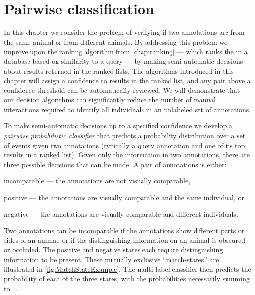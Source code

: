 
\begin{comment}
fixtex --reformat --fpaths chapter4-pairclf.tex --print
fixtex --fpaths chapter4-pairclf.tex --outline --asmarkdown --numlines=999 

fixtex --fpaths chapter4-pairclf.tex --outline --asmarkdown --numlines=999 --shortcite -w && ./checklang.py outline_chapter4-pairclf.md
https://www.languagetool.org/
\end{comment}

\newcommand{\nan}{\text{nan}}

\chapter{Pairwise classification}\label{chap:pairclf}

In this chapter we consider the problem of verifying if two annotations are from the same animal or from different
animals. By addressing this problem we improve upon the ranking algorithm from \cref{chap:ranking} --- which ranks
the \names{} in a database based on similarity to a query --- by making semi-automatic decisions about results
returned in the ranked lists. The algorithms introduced in this chapter will assign a confidence to results in the
ranked list, and any pair above a confidence threshold can be automatically reviewed. We will demonstrate that our
decision algorithms can significantly reduce the number of manual interactions required to identify all individuals
in an unlabeled set of annotations.

To make semi-automatic decisions up to a specified confidence we develop a \emph{pairwise probabilistic
  classifier} that predicts a probability distribution over a set of events given two annotations (typically a
  query annotation and one of its top results in a ranked list).
Given only the information in two annotations,  there are three possible decisions that can be made.
A pair of annotations is either:
\begin{enumln}
    \item incomparable --- the annotations are not visually comparable,

    \item positive --- the annotations are visually comparable and the same individual, or

    \item negative --- the annotations are visually comparable and different individuals.
\end{enumln}
Two annotations can be incomparable if the annotations show different parts or sides of an animal, or if the
  distinguishing information on an animal is obscured or occluded.
The positive and negative states each require distinguishing information to be present.
These mutually exclusive ``match-states'' are illustrated in \cref{fig:MatchStateExample}.
The multi-label classifier then predicts the probability of each of the three states, with the probabilities
  necessarily summing to $1$.

